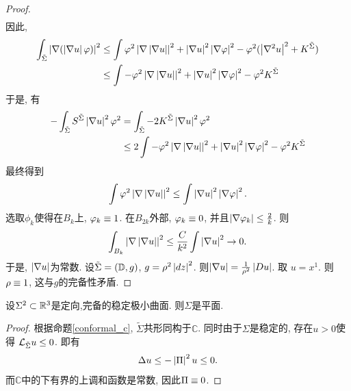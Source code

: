 \begin{proof}
\begin{align}
    \end{align}
    因此, 
    \begin{equation}
        \begin{split}
            \int_{\tilde{\Sigma}} \left | {\nabla} (\left | {\nabla} u \right |\varphi) \right |^2  & \le \int \varphi^2\left | {\nabla} \left | {\nabla} u \right | \right |^2 + \left | {\nabla} u \right |^2\left | {\nabla} \varphi \right |^2 -\varphi^2(\left | {\nabla}^2 u \right |^2 + K^{\tilde{\Sigma}}) \\
            &\le \int -\varphi^2\left | {\nabla} \left | {\nabla} u \right | \right |^2 + \left | {\nabla} u \right |^2\left | {\nabla} \varphi \right |^2 -\varphi^2K^{\tilde{\Sigma}}\\
        \end{split}
    \end{equation}
    于是, 有
    \begin{equation}
        \begin{split}
            -\int_{\tilde{\Sigma}} S^{\tilde{\Sigma}} \left | \nabla u \right |^2\varphi^2 &= \int_{\tilde{\Sigma}} -2K^{\tilde{\Sigma}}\left | \nabla u \right |^2\varphi^2 \\
            &\le 2\int -\varphi^2\left | {\nabla} \left | {\nabla} u \right | \right |^2 + \left | {\nabla} u \right |^2\left | {\nabla} \varphi \right |^2 -\varphi^2K^{\tilde{\Sigma}}
        \end{split}
    \end{equation}
    最终得到
    \begin{equation}
        \int \varphi^2 \left | \nabla \left | \nabla u \right | \right |^2 \le \int \left | \nabla u \right |^2 \left | \nabla \varphi \right |^2.
    \end{equation}
    选取$\phi_k$使得在$B_k$上, $\varphi_k \equiv 1$. 在$B_{2k}$外部, $\varphi_k \equiv 0$, 并且$\left | \nabla \varphi_k \right | \le \frac{2}{k}$. 则
    \begin{equation}
        \int_{B_k} \left | \nabla \left | \nabla u \right | \right |^2 \le \frac{C}{k^2}\int \left | \nabla u \right |^2 \to 0.
    \end{equation}
    于是, $\left | \nabla u \right |$为常数. 设${\tilde{\Sigma}}=(\mathbb{D}, g)$, $g=\rho^2 \left | dz \right |^2$. 则$\left | \nabla u \right |=\frac{1}{\rho^2} \left | Du \right |$. 取 $u=x^1$. 则$\rho \equiv 1$, 这与$g$的完备性矛盾.
\end{proof}
\begin{theorem} \label{stable_flat}
    设$\Sigma^2 \subset \mathbb{R}^3$是定向,完备的稳定极小曲面. 则$\Sigma$是平面.
\end{theorem}
\begin{proof}
    根据命题\eqref{conformal_c}, $\tilde{\Sigma}$共形同构于$\mathbb{C}$. 同时由于$\Sigma$是稳定的, 存在$u>0$使得 $\mathcal{L}_{\tilde{\Sigma}} u \le 0$. 即有
    \begin{equation}
        \Delta u \le - \left | {\Pi} \right |^2 u \le 0.
    \end{equation}
    而$\mathbb{C}$中的下有界的上调和函数是常数, 因此${\Pi} \equiv 0$.
\end{proof}
